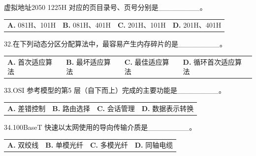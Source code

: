 \documentclass[UTF8,11pt]{ctexart}
\begin{document}
虚拟地址2050 1225H 对应的页目录号、页号分别是\_\_\_\_\_\_\_\_。


\begin{center}\begin{tabular}{>{\raggedright\arraybackslash}p{\dimexpr(\linewidth-8\tabcolsep)/4\relax}>{\raggedright\arraybackslash}p{\dimexpr(\linewidth-8\tabcolsep)/4\relax}>{\raggedright\arraybackslash}p{\dimexpr(\linewidth-8\tabcolsep)/4\relax}>{\raggedright\arraybackslash}p{\dimexpr(\linewidth-8\tabcolsep)/4\relax}}
\textbf{A.} 081H、101H & \textbf{B.} 081H、401H & \textbf{C.} 201H、101H & \textbf{D.} 201H、401H\\[.35em]\end{tabular}\end{center}

32.在下列动态分区分配算法中，最容易产生内存碎片的是\_\_\_\_\_\_\_\_。


\begin{center}\begin{tabular}{>{\raggedright\arraybackslash}p{\dimexpr(\linewidth-8\tabcolsep)/4\relax}>{\raggedright\arraybackslash}p{\dimexpr(\linewidth-8\tabcolsep)/4\relax}>{\raggedright\arraybackslash}p{\dimexpr(\linewidth-8\tabcolsep)/4\relax}>{\raggedright\arraybackslash}p{\dimexpr(\linewidth-8\tabcolsep)/4\relax}}
\textbf{A.} 首次适应算法 & \textbf{B.} 最坏适应算法 & \textbf{C.} 最佳适应算法 & \textbf{D.} 循环首次适应算法\\[.35em]\end{tabular}\end{center}

33.OSI 参考模型的第5 层（自下而上）完成的主要功能是\_\_\_\_\_\_\_\_。


\begin{center}\begin{tabular}{>{\raggedright\arraybackslash}p{\dimexpr(\linewidth-8\tabcolsep)/4\relax}>{\raggedright\arraybackslash}p{\dimexpr(\linewidth-8\tabcolsep)/4\relax}>{\raggedright\arraybackslash}p{\dimexpr(\linewidth-8\tabcolsep)/4\relax}>{\raggedright\arraybackslash}p{\dimexpr(\linewidth-8\tabcolsep)/4\relax}}
\textbf{A.} 差错控制 & \textbf{B.} 路由选择 & \textbf{C.} 会话管理 & \textbf{D.} 数据表示转换\\[.35em]\end{tabular}\end{center}

34.100BaseT 快速以太网使用的导向传输介质是\_\_\_\_\_\_\_\_。


\begin{center}\begin{tabular}{>{\raggedright\arraybackslash}p{\dimexpr(\linewidth-8\tabcolsep)/4\relax}>{\raggedright\arraybackslash}p{\dimexpr(\linewidth-8\tabcolsep)/4\relax}>{\raggedright\arraybackslash}p{\dimexpr(\linewidth-8\tabcolsep)/4\relax}>{\raggedright\arraybackslash}p{\dimexpr(\linewidth-8\tabcolsep)/4\relax}}
\textbf{A.} 双绞线 & \textbf{B.} 单模光纤 & \textbf{C.} 多模光纤 & \textbf{D.} 同轴电缆\\[.35em]\end{tabular}\end{center}
\end{document}
